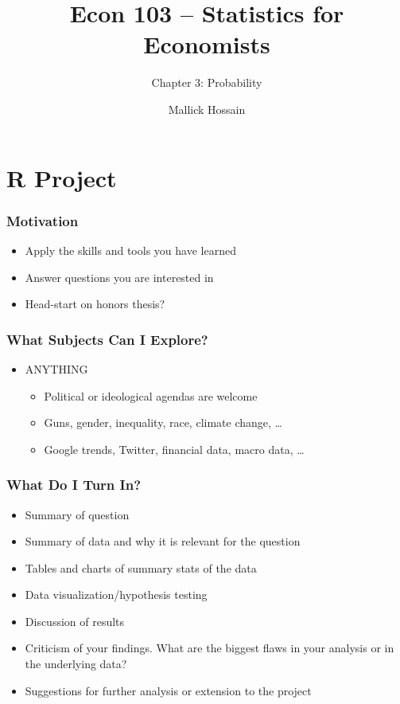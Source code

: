 \documentclass{beamer}
\title{Econ 103 -- Statistics for Economists}
\subtitle{Chapter 3: Probability}
\author{Mallick Hossain}
\date{}
\institute{University of Pennsylvania}
\begin{document}
 

\begin{frame}
	\titlepage 
\end{frame} 

\section{R Project}
\begin{frame}
\frametitle{Motivation}
    \begin{itemize}[<+- | alert@+>]
        \item Apply the skills and tools you have learned
        \item Answer questions you are interested in
        \item Head-start on honors thesis?
    \end{itemize}
\end{frame}

\begin{frame}
\frametitle{What Subjects Can I Explore?}
    \begin{itemize}[<+- | alert@+>]
        \item ANYTHING
        \begin{itemize}
        		\item Political or ideological agendas are welcome
        		\item Guns, gender, inequality, race, climate change, \ldots
        		\item Google trends, Twitter, financial data, macro data, \ldots
        \end{itemize}
    \end{itemize}
\end{frame}

\begin{frame}
\frametitle{What Do I Turn In?}
    \begin{itemize}[<+- | alert@+>]
        	\item Summary of question
		\item Summary of data and why it is relevant for the question			
		\item Tables and charts of summary stats of the data
		\item Data visualization/hypothesis testing
		\item Discussion of results
		\item Criticism of your findings. What are the biggest flaws in your analysis or in the underlying data?
		\item Suggestions for further analysis or extension to the project
    \end{itemize}
\end{frame}
\end{document}
